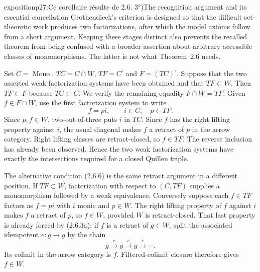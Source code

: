 \begin{dcomment}{exposition}{p27:Ce corollaire résulte de 2.6. 3°)}{The recognition argument and its essential cancellation}
Grothendieck's criterion is designed so that the difficult set-theoretic work produces two factorizations, after which the model axioms follow from a short argument. Keeping these stages distinct also prevents the recalled theorem from being confused with a broader assertion about arbitrary accessible classes of monomorphisms. The latter is not what Theorem~2.6 needs.

Set $C=\operatorname{Mono}$, $TC=C\cap W$, $TF=C^{\square}$ and $F=(TC)^{\square}$. Suppose that the two asserted weak factorization systems have been obtained and that $TF\subset W$. Then $TF\subset F$ because $TC\subset C$. We verify the remaining equality $F\cap W=TF$. Given $f\in F\cap W$, use the first factorization system to write
\[
 f=pi,\qquad i\in C,\quad p\in TF.
\]
Since $p,f\in W$, two-out-of-three puts $i$ in $TC$. Since $f$ has the right lifting property against $i$, the usual diagonal makes $f$ a retract of $p$ in the arrow category. Right lifting classes are retract-closed, so $f\in TF$. The reverse inclusion has already been observed. Hence the two weak factorization systems have exactly the intersections required for a closed Quillen triple.

The alternative condition (2.6.6) is the same retract argument in a different position. If $TF\subset W$, factorization with respect to $(C,TF)$ supplies a monomorphism followed by a weak equivalence. Conversely suppose each $f\in TF$ factors as $f=pi$ with $i$ monic and $p\in W$. The right lifting property of $f$ against $i$ makes $f$ a retract of $p$, so $f\in W$, provided $W$ is retract-closed. That last property is already forced by (2.6.3a): if $f$ is a retract of $g\in W$, split the associated idempotent $e:g\to g$ by the chain
\[
 g\xrightarrow e g\xrightarrow e g\xrightarrow e\cdots .
\]
Its colimit in the arrow category is $f$. Filtered-colimit closure therefore gives $f\in W$.


\end{dcomment}
